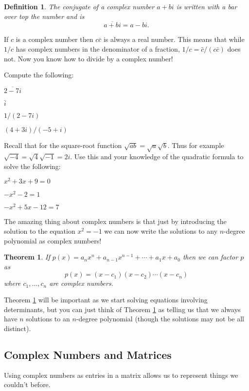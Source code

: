 \documentclass{article}
\newtheorem{definition}{Definition}
\newtheorem{theorem}{Theorem}
\begin{document}
	\begin{definition}
		The \emph{conjugate} of a complex number $a+bi$ is written with a bar over
		top the number and is
		\[
			\overline{a+bi}=a-bi.
		\]
	\end{definition}

	If $c$ is a complex number then $c\bar c$ is always a real number.  This
	means that while $1/c$ has complex numbers in the denominator
	of a fraction, $1/c=\bar c/(c\bar c)$ does not.  Now you know how to divide
	by a complex number!

	Compute the following:
	\begin{Enum}
		\item $\overline{2-7i}$
		\item $\bar i$
		\item $1/(2-7i)$
		\item $(4+3i)/(-5+i)$
	\end{Enum}

	Recall that for the square-root function $\sqrt{ab}=\sqrt{a}\sqrt{b}$.
	Thus for example $\sqrt{-4}=\sqrt{4}\sqrt{-1}=2i$.  Use this and your
	knowledge of the quadratic formula to solve the following:
	\begin{Enum}
		\item $x^2+3x+9=0$
		\item $-x^2-2=1$
		\item $-x^2+5x-12=7$
	\end{Enum}

	The amazing thing about complex numbers is that just by introducing the
	solution to the equation $x^2=-1$ we can now write the solutions
	to any $n$-degree polynomial as complex numbers!
	\begin{theorem}\label{t}
		If $p(x)=a_nx^n+a_{n-1}x^{n-1}+\cdots+a_1x+a_0$ then we can factor $p$
		as
		\[
			p(x)=(x-c_1)(x-c_2)\cdots (x-c_n)
		\]
		where $c_1,\ldots,c_n$ are complex numbers.
	\end{theorem}

	Theorem \ref{t} will be important as we start solving equations
	involving determinants, but you can just think of Theorem \ref{t} as
	telling us that we always have $n$ solutions to an $n$-degree polynomial
	(though the solutions may not be all distinct).

\subsection*{Complex Numbers and Matrices}
	Using complex numbers as entries in a matrix allows us to represent things
	we couldn't before.
\end{document}
